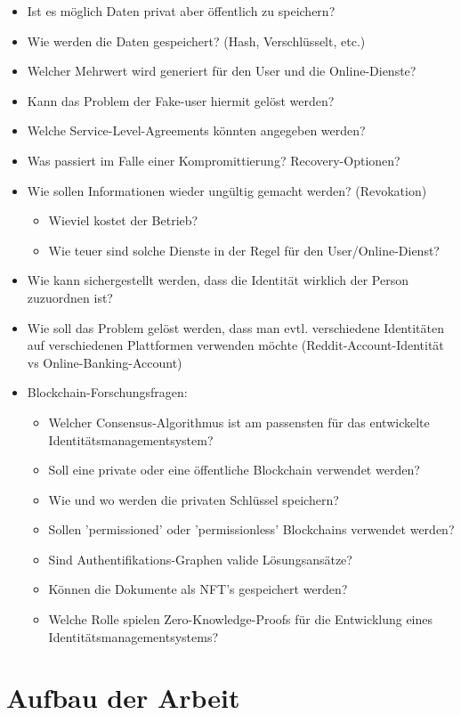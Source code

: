 \begin{itemize}
	\item Ist es möglich Daten privat aber öffentlich zu speichern?
	\item Wie werden die Daten gespeichert? (Hash, Verschlüsselt, etc.) 
	\item Welcher Mehrwert wird generiert für den User und die Online-Dienste?
	\item Kann das Problem der Fake-user hiermit gelöst werden?
	\item Welche Service-Level-Agreements könnten angegeben werden?
	\item Was passiert im Falle einer Kompromittierung?  Recovery-Optionen?
	\item Wie sollen Informationen wieder ungültig gemacht werden? (Revokation)
	\begin{itemize}
		\item Wieviel kostet der Betrieb?
		\item Wie teuer sind solche Dienste in der Regel für den User/Online-Dienst?
		
	\end{itemize}
	\item Wie kann sichergestellt werden, dass die Identität wirklich der Person zuzuordnen ist?
	\item Wie soll das Problem gelöst werden, dass man evtl. verschiedene Identitäten auf verschiedenen Plattformen verwenden möchte (Reddit-Account-Identität vs Online-Banking-Account)
	\item Blockchain-Forschungsfragen:
	\begin{itemize}
		\item Welcher Consensus-Algorithmus ist am passensten für das entwickelte Identitätsmanagementsystem?
		\item Soll eine private oder eine öffentliche Blockchain verwendet werden?
		\item Wie und wo werden die privaten Schlüssel speichern?
		\item Sollen 'permissioned' oder 'permissionless' Blockchains verwendet werden?
		\item Sind Authentifikations-Graphen valide Lösungsansätze?
		\item Können die Dokumente als NFT's gespeichert werden?
		\item Welche Rolle spielen Zero-Knowledge-Proofs für die Entwicklung eines Identitätsmanagementsystems?
	\end{itemize}
	
	
	
\end{itemize}

\section{Aufbau der Arbeit}
\blindtext